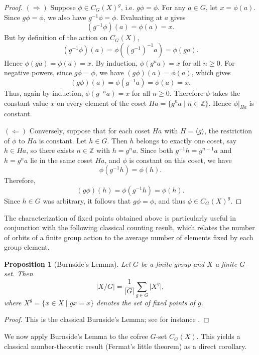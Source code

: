 \documentclass[10pt,a4paper]{amsart}
\newtheorem{proposition}{Proposition}
\begin{document}
\begin{proof}
$(\Rightarrow)$ Suppose $\phi \in C_G(X)^g$, i.e. $g \phi = \phi$. 
For any $a \in G$, let $x = \phi(a)$. Since $g \phi = \phi$, we also have $g^{-1} \phi = \phi$. Evaluating at $a$ gives
\[
(g^{-1}\phi)(a) = \phi(a) = x.
\]
But by definition of the action on $C_G(X)$,
\[
(g^{-1}\phi)(a) = \phi((g^{-1})^{-1}a) = \phi(g a).
\]
Hence $\phi(g a) = \phi(a) = x$. By induction, $\phi(g^n a) = x$ for all $n \ge 0$. 
For negative powers, since $g \phi = \phi$, we have $(g \phi)(a) = \phi(a)$, which gives
\[
(g \phi)(a) = \phi(g^{-1}a) = \phi(a) = x.
\]
Thus, again by induction, $\phi(g^{-n} a) = x$ for all $n \ge 0$. Therefore $\phi$ takes the constant value $x$ on every element of the coset $Ha = \{g^n a \mid n \in \mathbb{Z}\}$. Hence $\phi|_{Ha}$ is constant.

$(\Leftarrow)$ Conversely, suppose that for each coset $Ha$ with $H = \langle g \rangle$, the restriction of $\phi$ to $Ha$ is constant. 
Let $h \in G$. Then $h$ belongs to exactly one coset, say $h \in Ha$, so there exists $n \in \mathbb{Z}$ with $h = g^n a$. Since both $g^{-1}h = g^{n-1}a$ and $h = g^n a$ lie in the same coset $Ha$, and $\phi$ is constant on this coset, we have
\[
\phi(g^{-1} h) = \phi(h).
\]
Therefore,
\[
(g \phi)(h) = \phi(g^{-1} h) = \phi(h).
\]
Since $h \in G$ was arbitrary, it follows that $g \phi = \phi$, and thus $\phi \in C_G(X)^g$.
\end{proof}

The characterization of fixed points obtained above is particularly useful in conjunction with the following classical counting result, which relates the number of orbits of a finite group action to the average number of elements fixed by each group element.

\begin{proposition}[Burnside's Lemma]\label{prop:burnside}
Let $G$ be a finite group and $X$ a finite $G$-set. Then
\[
\lvert X/G \rvert = \frac{1}{\lvert G \rvert} \sum_{g \in G} \lvert X^g \rvert,
\]
where $X^g = \{ x \in X \mid g x = x \}$ denotes the set of fixed points of $g$.
\end{proposition}
\begin{proof}
This is the classical Burnside's Lemma; see for instance \cite{rotman2012introduction}.
\end{proof}

We now apply Burnside's Lemma to the cofree $G$-set $C_G(X)$. This yields a classical number-theoretic result (Fermat's little theorem) as a direct corollary.
\end{document}
